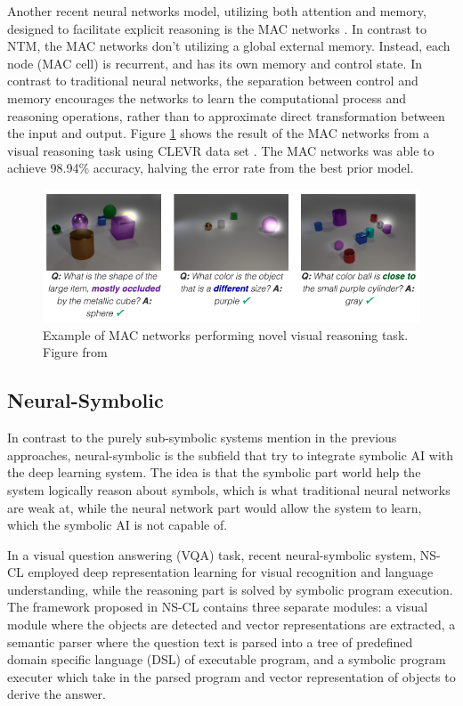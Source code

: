 \documentclass[journal]{IEEEtran}
\begin{document}
Another recent neural networks model, utilizing both attention and memory, designed to facilitate explicit reasoning is the MAC networks \cite{hudson2018compositional}.
In contrast to NTM, the MAC networks don't utilizing a global external memory. Instead, each node (MAC cell) is recurrent, and has its own memory and control state.
In contrast to traditional neural networks, the separation between control and memory encourages the networks to 
learn the computational process and reasoning operations, rather than to approximate direct transformation between the input and output.
Figure \ref{mac-clevr} shows the result of the MAC networks from a visual reasoning task using CLEVR data set \cite{johnson2017clevr}. 
The MAC networks was able to achieve 98.94\% accuracy, halving the error rate from the best prior model.
\begin{figure}[htb]
  \includegraphics[width=\linewidth]{mac-clevr.png}
  \caption{Example of MAC networks performing novel visual reasoning task. Figure from \cite{hudson2018compositional}}
  \label{mac-clevr}
\end{figure}

\subsection{Neural-Symbolic}

In contrast to the purely sub-symbolic systems mention in the previous approaches, neural-symbolic is the subfield that try to integrate symbolic AI with the deep learning system. 
The idea is that the symbolic part world help the system logically reason about symbols, which is what traditional neural networks are weak at, 
while the neural network part would allow the system to learn, which the symbolic AI is not capable of.

In a visual question answering (VQA) task, recent neural-symbolic system, NS-CL \cite{Mao2019NeuroSymbolic} employed deep representation learning
for visual recognition and language understanding, while the reasoning part is solved by symbolic program execution.
The framework proposed in NS-CL contains three separate modules: 
a visual module where the objects are detected and vector representations are extracted, 
a semantic parser where the question text is parsed into a tree of predefined domain specific language (DSL) of executable program,
and a symbolic program executer which take in the parsed program and vector representation of objects to derive the answer. 
\end{document}
